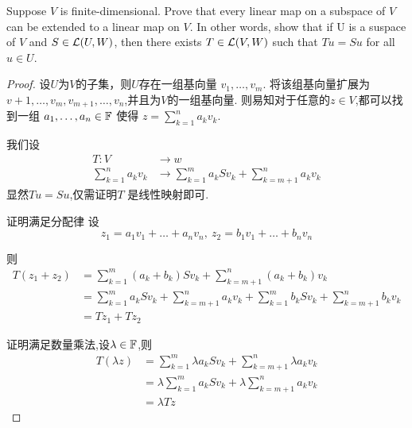 \begin{problem}{11}
  Suppose $V$ is  finite-dimensional. Prove that every linear
  map on a subspace of $V$ can be extended to a linear map
  on $V$. In other words, show that if U is a suspace of $V$ and
  $S\in\mathcal{L}(U,W)$, then there exists $T\in\mathcal{L}(V,W)$ such
  that $Tu=Su$ for all $u\in U$.
\end{problem}

\begin{proof}
  设$U$为$V$的子集，则$U$存在一组基向量
  $v_1,\dots,v_m$. 将该组基向量扩展为
  $v+1,\dots,v_m,v_{m+1},\dots,v_n$,并且为$V$的一组基向量.
  则易知对于任意的$z\in V$,都可以找到一组
  $a_1,\dots,a_n \in \mathbb{F}$ 使得 $z=\sum_{k=1}^{n}a_k v_k$.

  我们设
  \begin{align*}
    T:V&\rightarrow w\\
    \displaystyle\sum_{k=1}^{n}a_k v_k &\rightarrow \displaystyle\sum_{k=1}^{m}a_k S v_k + \displaystyle\sum_{k=m+1}^{n} a_k v_k
  \end{align*}
  显然$Tu=Su$,仅需证明$T$ 是线性映射即可.

  证明满足分配律
  设
  \[
    z_1 = a_1v_1+\dots+a_nv_n,\ z_2 = b_1v_1+\dots+b_nv_n
  \]

  则
  \begin{align*}
    T(z_1+z_2) &= \displaystyle\sum_{k=1}^{m} (a_k+b_k)Sv_k + \displaystyle\sum_{k=m+1}^{n} (a_k+b_k) v_k\\
               &= \displaystyle\sum_{k=1}^{m} a_kSv_k +\displaystyle\sum_{k=m+1}^{n} a_k v_k + \displaystyle\sum_{k=1}^{m} b_kSv_k +\displaystyle\sum_{k=m+1}^{n} b_k v_k\\
               &=Tz_1+Tz_2
  \end{align*}

  证明满足数量乘法,设$\lambda\in \mathbb{F}$,则
  \begin{align*}
    T(\lambda z) &= \displaystyle\sum_{k=1}^{m} \lambda a_kSv_k + \displaystyle\sum_{k=m+1}^{n} \lambda a_k v_k\\
                   &= \lambda\displaystyle\sum_{k=1}^{m}  a_kSv_k + \lambda\displaystyle\sum_{k=m+1}^{n}  a_k v_k\\
                   &= \lambda Tz
  \end{align*}

  \end{proof}

